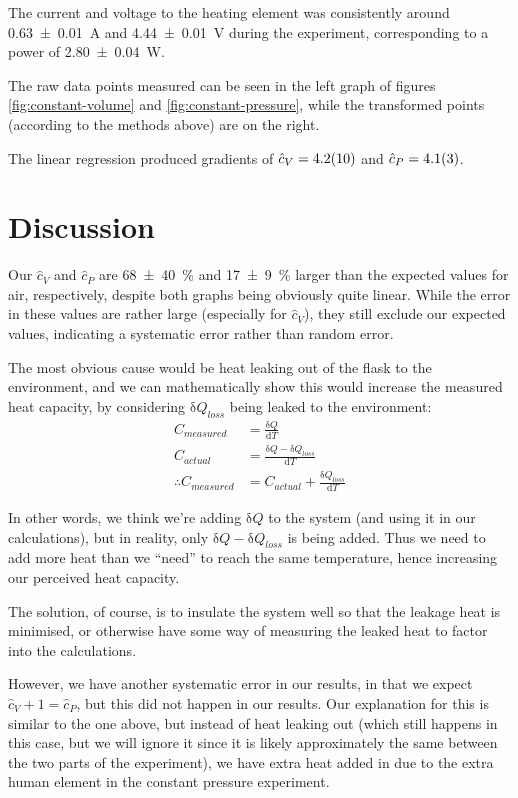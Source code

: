 \documentclass[a4paper]{scrartcl}
\begin{document}
The current and voltage to the heating element was consistently around \SI{0.63 \pm 0.01}{\ampere} and \SI{4.44 \pm 0.01}{\volt} during the experiment, corresponding to a power of \SI{2.80 \pm 0.04}{\watt}.

The raw data points measured can be seen in the left graph of figures \ref{fig:constant-volume} and \ref{fig:constant-pressure}, while the transformed points (according to the methods above) are on the right.

The linear regression produced gradients of \(\hat{c}_V = \SI{4.2 \pm 1.0}{}\) and \(\hat{c}_P = \SI{4.1 \pm 0.3}{}\).

\section{Discussion}
Our \(\hat{c}_V\) and \(\hat{c}_P\) are \SI{68 \pm 40}{\percent} and \SI{17 \pm 9}{\percent} larger than the expected values for air, respectively, despite both graphs being obviously quite linear. While the error in these values are rather large (especially for \(\hat{c}_V\)), they still exclude our expected values, indicating a systematic error rather than random error.

The most obvious cause would be heat leaking out of the flask to the environment, and we can mathematically show this would increase the measured heat capacity, by considering \(\mathrm{\delta} Q_{loss}\) being leaked to the environment:
\begin{align*}
    C_{measured} &= \frac{\mathrm{\delta} Q}{\mathrm{d} T} \\
    C_{actual} &= \frac{\mathrm{\delta} Q - \mathrm{\delta} Q_{loss}}{\mathrm{d} T} \\
    \therefore C_{measured} &= C_{actual} + \frac{\mathrm{\delta} Q_{loss}}{\mathrm{d} T}
\end{align*}

In other words, we think we're adding \(\mathrm{\delta} Q\) to the system (and using it in our calculations), but in reality, only \(\mathrm{\delta} Q - \mathrm{\delta} Q_{loss}\) is being added. Thus we need to add more heat than we ``need'' to reach the same temperature, hence increasing our perceived heat capacity.

The solution, of course, is to insulate the system well so that the leakage heat is minimised, or otherwise have some way of measuring the leaked heat to factor into the calculations.

However, we have another systematic error in our results, in that we expect \(\hat{c}_V + 1 = \hat{c}_P\), but this did not happen in our results. Our explanation for this is similar to the one above, but instead of heat leaking out (which still happens in this case, but we will ignore it since it is likely approximately the same between the two parts of the experiment), we have extra heat added in due to the extra human element in the constant pressure experiment.
\end{document}
